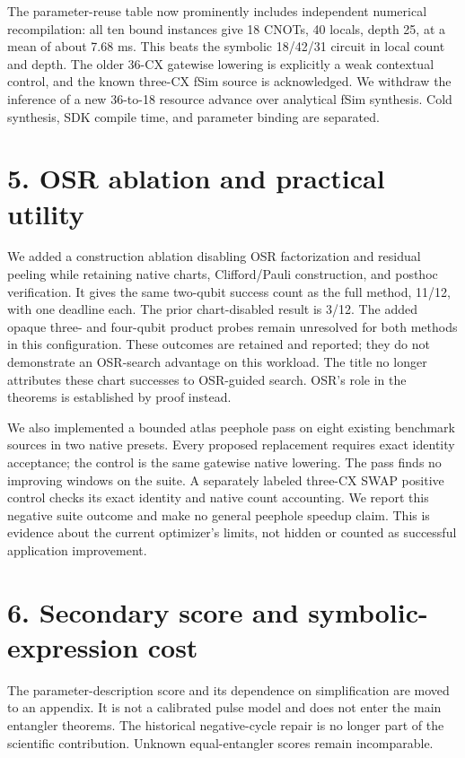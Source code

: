 \documentclass[11pt]{article}
\begin{document}
The parameter-reuse table now prominently includes independent numerical
recompilation: all ten bound instances give 18 CNOTs, 40 locals, depth 25,
at a mean of about 7.68 ms. This beats the symbolic 18/42/31 circuit in local
count and depth. The older 36-CX gatewise lowering is explicitly a weak
contextual control, and the known three-CX fSim source is acknowledged.
We withdraw the inference of a new 36-to-18 resource advance over analytical
fSim synthesis. Cold synthesis, SDK compile time, and parameter binding are
separated.

\section*{5. OSR ablation and practical utility}
We added a construction ablation disabling OSR factorization and residual
peeling while retaining native charts, Clifford/Pauli construction, and
posthoc verification. It gives the same two-qubit success count as the full
method, 11/12, with one deadline each. The prior chart-disabled result is
3/12. The added opaque three- and four-qubit product probes remain unresolved
for both methods in this configuration. These outcomes are retained and
reported; they do not demonstrate an OSR-search advantage on this workload.
The title no longer attributes these chart successes to OSR-guided search.
OSR's role in the theorems is established by proof instead.

We also implemented a bounded atlas peephole pass on eight existing benchmark
sources in two native presets. Every proposed replacement requires exact
identity acceptance; the control is the same gatewise native lowering.
The pass finds no improving windows on the suite. A separately labeled
three-CX SWAP positive control checks its exact identity and native count
accounting. We report this negative suite outcome and make no general
peephole speedup claim. This is evidence about the current optimizer's limits,
not hidden or counted as successful application improvement.

\section*{6. Secondary score and symbolic-expression cost}
The parameter-description score and its dependence on simplification are
moved to an appendix. It is not a calibrated pulse model and does not enter
the main entangler theorems. The historical negative-cycle repair is no longer
part of the scientific contribution. Unknown equal-entangler scores remain
incomparable.
\end{document}
